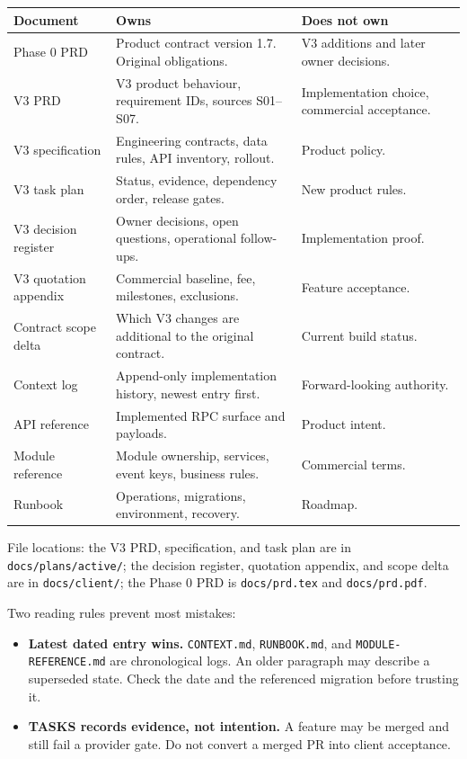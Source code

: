 \documentclass[11pt,a4paper]{article}
\newcommand{\code}[1]{\texttt{#1}}
\begin{document}
\begin{longtable}{@{}L{4.1cm}L{7.0cm}L{4.0cm}@{}}
\toprule
\textbf{Document} & \textbf{Owns} & \textbf{Does not own} \\
\midrule
\endhead
Phase 0 PRD & Product contract version 1.7. Original obligations. & V3 additions and later owner decisions. \\
V3 PRD & V3 product behaviour, requirement IDs, sources S01--S07. & Implementation choice, commercial acceptance. \\
V3 specification & Engineering contracts, data rules, API inventory, rollout. & Product policy. \\
V3 task plan & Status, evidence, dependency order, release gates. & New product rules. \\
V3 decision register & Owner decisions, open questions, operational follow-ups. & Implementation proof. \\
V3 quotation appendix & Commercial baseline, fee, milestones, exclusions. & Feature acceptance. \\
Contract scope delta & Which V3 changes are additional to the original contract. & Current build status. \\
Context log & Append-only implementation history, newest entry first. & Forward-looking authority. \\
API reference & Implemented RPC surface and payloads. & Product intent. \\
Module reference & Module ownership, services, event keys, business rules. & Commercial terms. \\
Runbook & Operations, migrations, environment, recovery. & Roadmap. \\
\bottomrule
\end{longtable}

\noindent File locations: the V3 PRD, specification, and task plan are in \code{docs/plans/active/}; the decision register, quotation appendix, and scope delta are in \code{docs/client/}; the Phase 0 PRD is \code{docs/prd.tex} and \code{docs/prd.pdf}.

Two reading rules prevent most mistakes:

\begin{itemize}
	\item \textbf{Latest dated entry wins.} \code{CONTEXT.md}, \code{RUNBOOK.md}, and \code{MODULE-REFERENCE.md} are chronological logs. An older paragraph may describe a superseded state. Check the date and the referenced migration before trusting it.
	\item \textbf{TASKS records evidence, not intention.} A feature may be merged and still fail a provider gate. Do not convert a merged PR into client acceptance.
\end{itemize}
\end{document}
